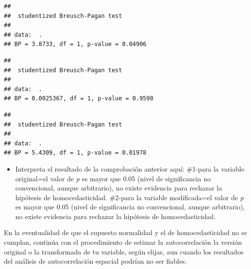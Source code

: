 \documentclass[11pt,]{article}
\newenvironment{Shaded}{\begin{snugshade}}{\end{snugshade}}
\newcommand{\KeywordTok}[1]{\textcolor[rgb]{0.13,0.29,0.53}{\textbf{#1}}}
\newcommand{\StringTok}[1]{\textcolor[rgb]{0.31,0.60,0.02}{#1}}
\newcommand{\OperatorTok}[1]{\textcolor[rgb]{0.81,0.36,0.00}{\textbf{#1}}}
\newcommand{\NormalTok}[1]{#1}
\providecommand{\tightlist}{%
\setlength{\itemsep}{0pt}\setlength{\parskip}{0pt}}
\begin{document}
\begin{verbatim}
## 
##  studentized Breusch-Pagan test
## 
## data:  .
## BP = 3.8733, df = 1, p-value = 0.04906
\end{verbatim}

\begin{Shaded}
\end{Shaded}

\begin{verbatim}
## 
##  studentized Breusch-Pagan test
## 
## data:  .
## BP = 0.0025367, df = 1, p-value = 0.9598
\end{verbatim}

\begin{Shaded}
\end{Shaded}

\begin{verbatim}
## 
##  studentized Breusch-Pagan test
## 
## data:  .
## BP = 5.4309, df = 1, p-value = 0.01978
\end{verbatim}

\begin{itemize}
\tightlist
\item
  Interpreta el resultado de la comprobación anterior aquí: \#1-para la
  variable original=el valor de \emph{p} es mayor que 0.05 (nivel de
  significancia no convencional, aunque arbitrario), no existe evidencia
  para rechazar la hipótesis de homocedasticidad. \#2-para la variable
  modificada=el valor de \emph{p} es mayor que 0.05 (nivel de
  significancia no convencional, aunque arbitrario), no existe evidencia
  para rechazar la hipótesis de homocedasticidad.
\end{itemize}

En la eventualidad de que el supuesto normalidad y el de
homocedasticidad no se cumplan, continúa con el procedimiento de estimar
la autocorrelación la versión original o la transformada de tu variable,
según elijas, aun cuando los resultados del análisis de autocorrelación
espacial podrían no ser fiables.
\end{document}
